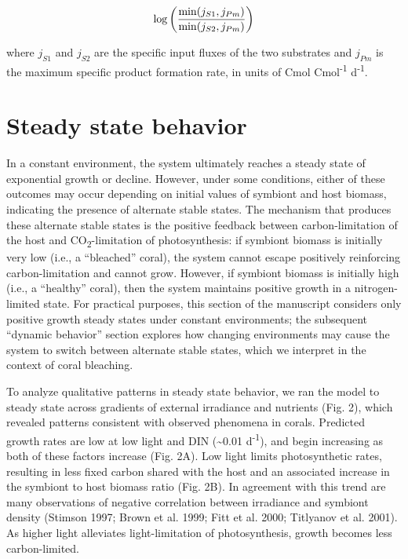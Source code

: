 \documentclass[]{elsarticle} %
\begin{document}
\begin{equation} \log \bigg({{\min(j_{S1}, j_{Pm})} \over {\min(j_{S2}, j_{Pm})}}\bigg) \end{equation}

where \(j_{S1}\) and \(j_{S2}\) are the specific input fluxes of the two
substrates and \(j_{Pm}\) is the maximum specific product formation
rate, in units of Cmol Cmol\textsuperscript{-1} d\textsuperscript{-1}.

\section{Steady state behavior}\label{steady-state-behavior}

In a constant environment, the system ultimately reaches a steady state
of exponential growth or decline. However, under some conditions, either
of these outcomes may occur depending on initial values of symbiont and
host biomass, indicating the presence of alternate stable states. The
mechanism that produces these alternate stable states is the positive
feedback between carbon-limitation of the host and
CO\textsubscript{2}-limitation of photosynthesis: if symbiont biomass is
initially very low (i.e., a ``bleached'' coral), the system cannot
escape positively reinforcing carbon-limitation and cannot grow.
However, if symbiont biomass is initially high (i.e., a ``healthy''
coral), then the system maintains positive growth in a nitrogen-limited
state. For practical purposes, this section of the manuscript considers
only positive growth steady states under constant environments; the
subsequent ``dynamic behavior'' section explores how changing
environments may cause the system to switch between alternate stable
states, which we interpret in the context of coral bleaching.

To analyze qualitative patterns in steady state behavior, we ran the
model to steady state across gradients of external irradiance and
nutrients (Fig. 2), which revealed patterns consistent with observed
phenomena in corals. Predicted growth rates are low at low light and DIN
(\textasciitilde{}0.01 d\textsuperscript{-1}), and begin increasing as
both of these factors increase (Fig. 2A). Low light limits
photosynthetic rates, resulting in less fixed carbon shared with the
host and an associated increase in the symbiont to host biomass ratio
(Fig. 2B). In agreement with this trend are many observations of
negative correlation between irradiance and symbiont density (Stimson
1997; Brown et al. 1999; Fitt et al. 2000; Titlyanov et al. 2001). As
higher light alleviates light-limitation of photosynthesis, growth
becomes less carbon-limited.
\end{document}
